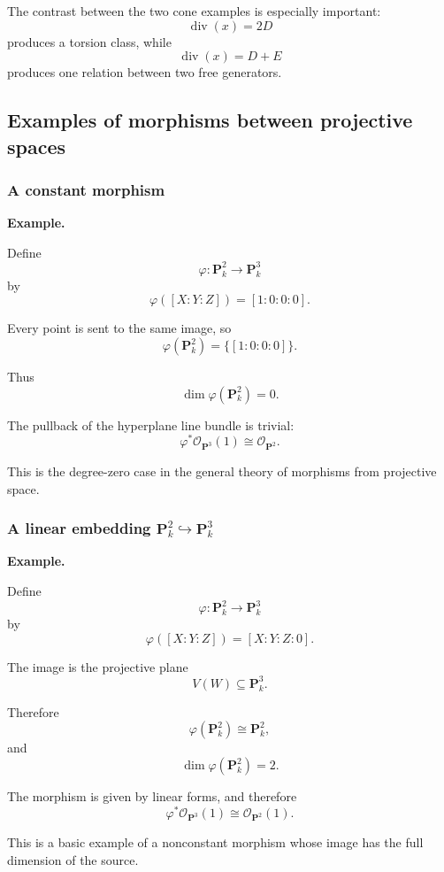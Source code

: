 The contrast between the two cone examples is especially important:
\[
\operatorname{div}(x)=2D
\]
produces a torsion class, while
\[
\operatorname{div}(x)=D+E
\]
produces one relation between two free generators.

\subsection{Examples of morphisms between projective spaces}

\subsubsection{A constant morphism}

\textbf{Example.}

Define
\[
\varphi:\mathbf P^2_k\longrightarrow\mathbf P^3_k
\]
by
\[
\varphi([X:Y:Z])=[1:0:0:0].
\]

Every point is sent to the same image, so
\[
\varphi(\mathbf P^2_k)=\{[1:0:0:0]\}.
\]

Thus
\[
\dim\varphi(\mathbf P^2_k)=0.
\]

The pullback of the hyperplane line bundle is trivial:
\[
\varphi^*\mathcal O_{\mathbf P^3}(1)
\cong
\mathcal O_{\mathbf P^2}.
\]

This is the degree-zero case in the general theory of morphisms from projective space.

\subsubsection{A linear embedding \(\mathbf P^2_k\hookrightarrow\mathbf P^3_k\)}

\textbf{Example.}

Define
\[
\varphi:\mathbf P^2_k\longrightarrow\mathbf P^3_k
\]
by
\[
\varphi([X:Y:Z])=[X:Y:Z:0].
\]

The image is the projective plane
\[
V(W)\subseteq\mathbf P^3_k.
\]

Therefore
\[
\varphi(\mathbf P^2_k)\cong\mathbf P^2_k,
\]
and
\[
\dim\varphi(\mathbf P^2_k)=2.
\]

The morphism is given by linear forms, and therefore
\[
\varphi^*\mathcal O_{\mathbf P^3}(1)
\cong
\mathcal O_{\mathbf P^2}(1).
\]

This is a basic example of a nonconstant morphism whose image has the full dimension of the source.

